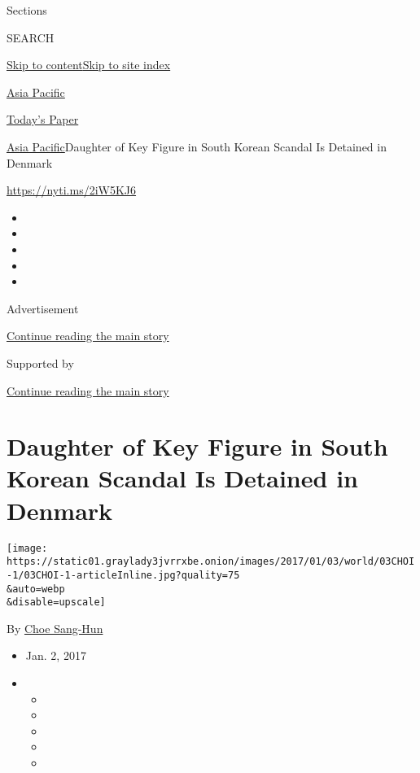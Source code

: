 Sections

SEARCH

\protect\hyperlink{site-content}{Skip to
content}\protect\hyperlink{site-index}{Skip to site index}

\href{https://www.nytimes3xbfgragh.onion/section/world/asia}{Asia
Pacific}

\href{https://myaccount.nytimes3xbfgragh.onion/auth/login?response_type=cookie\&client_id=vi}{}

\href{https://www.nytimes3xbfgragh.onion/section/todayspaper}{Today's
Paper}

\href{/section/world/asia}{Asia Pacific}\textbar{}Daughter of Key Figure
in South Korean Scandal Is Detained in Denmark

\url{https://nyti.ms/2iW5KJ6}

\begin{itemize}
\item
\item
\item
\item
\item
\end{itemize}

Advertisement

\protect\hyperlink{after-top}{Continue reading the main story}

Supported by

\protect\hyperlink{after-sponsor}{Continue reading the main story}

\hypertarget{daughter-of-key-figure-in-south-korean-scandal-is-detained-in-denmark}{%
\section{Daughter of Key Figure in South Korean Scandal Is Detained in
Denmark}\label{daughter-of-key-figure-in-south-korean-scandal-is-detained-in-denmark}}

\texttt{[image: https://static01.graylady3jvrrxbe.onion/images/2017/01/03/world/03CHOI-1/03CHOI-1-articleInline.jpg?quality=75\\\&auto=webp\\\&disable=upscale]}

By \href{http://www.nytimes3xbfgragh.onion/by/choe-sang-hun}{Choe
Sang-Hun}

\begin{itemize}
\item
  Jan. 2, 2017
\item
  \begin{itemize}
  \item
  \item
  \item
  \item
  \item
  \end{itemize}
\end{itemize}

